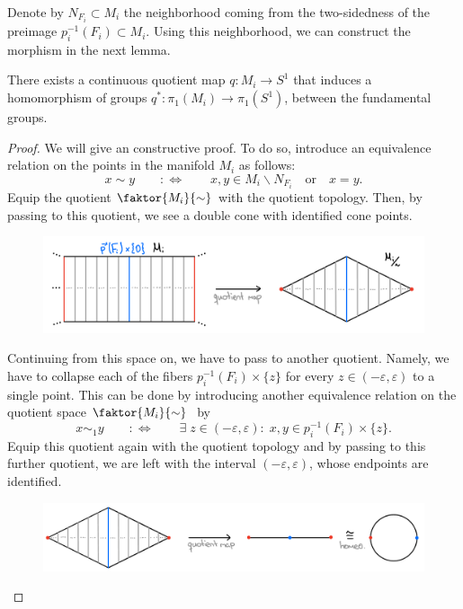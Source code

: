 Denote by \(N_{F_i} \subset M_i\) the neighborhood coming from the two-sidedness of the preimage \(p_i^{-1}(F_i) \subset M_i\).
Using this neighborhood, we can construct the morphism in the next lemma.

\begin{lemma}
    There exists a continuous quotient map \(q : M_i \to S^1\) that induces a homomorphism of groups \(q^* : \pi_1(M_i) \to \pi_1(S^1)\), between the fundamental groups.
\end{lemma}
\begin{proof}
    We will give an constructive proof.
    To do so, introduce an equivalence relation on the points in the manifold \(M_i\) as follows:
    \[x \sim y \qquad :\iff \qquad x,y \in M_i \backslash N_{F_i} \quad\text{or}\quad x = y.\]
    Equip the quotient \(\faktor{M_i}{\sim}\) with the quotient topology.
    Then, by passing to this quotient, we see a double cone with identified cone points.
    \begin{figure}[h!]
        \label{fig:doublecone}
        \centering
        \includegraphics[width=.7\textwidth]{gfx/Quotient 1.png}
    \end{figure}\vspace*{-\parskip}
    
    \noindent
    Continuing from this space on, we have to pass to another quotient.
    Namely, we have to collapse each of the fibers \(p_i^{-1}(F_i) \times \{z\}\) for every \(z \in (-\varepsilon, \varepsilon)\) to a single point.
    This can be done by introducing another equivalence relation on the quotient space \(\faktor{M_i}{\sim}\;\) by 
    \[x \sim_1 y \qquad :\iff \qquad \exists\; z \in (-\varepsilon, \varepsilon): \; x,y \in p_i^{-1}(F_i) \times \{z\}.\]
    Equip this quotient again with the quotient topology and by passing to this further quotient, we are left with the interval \((-\varepsilon, \varepsilon)\), whose endpoints are identified.
    \begin{figure}[ht!]
        \label{fig:circle}
        \centering
        \includegraphics[width=.7\textwidth]{gfx/Quotient 2.png}
    \end{figure}\vspace*{-\parskip}


\end{proof}
